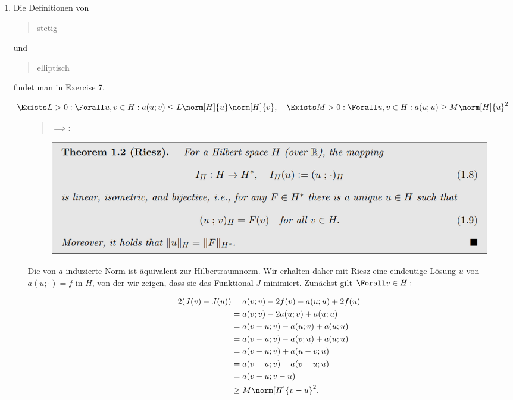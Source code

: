\begin{solution}

\phantom{}

\begin{enumerate}[label = \textbf{\alph*)}]

  \item Die Definitionen von \blockquote{stetig} und \blockquote{elliptisch} findet man in Exercise 7.

  \begin{align*}
    \Exists L > 0:
    \Forall u, v \in H:
    a(u; v) \leq L \norm[H]{u} \norm[H]{v},
    \quad
    \Exists M > 0:
    \Forall u, v \in H:
    a(u; u) \geq M \norm[H]{u}^2
  \end{align*}

  \begin{itemize}

    \item
    [\blockquote{$\implies$:}]

    \begin{figure}[h!]
      \centering
      \includegraphics[width = 0.9 \textwidth]{../../../Fundament-LaTeX/images/NumPDEs/NumPDEs - Theorem 1.2 (Riesz).png}
    \end{figure}

    Die von $a$ induzierte Norm ist äquivalent zur Hilbertraumnorm.
    Wir erhalten daher mit Riesz eine eindeutige Lösung $u$ von $a(u; \cdot) = f$ in $H$, von der wir zeigen, dass sie das Funktional $J$ minimiert.
    Zunächst gilt $\Forall v \in H:$

    \begin{align*}
      2 (J(v) - J(u))
      & =
      a(v; v) - 2f(v) - a(u; u) + 2 f(u) \\
      & =
      a(v; v) -2a(u; v) + a(u; u) \\
      & =
      a(v-u; v) - a(u; v) + a(u; u) \\
      & =
      a(v-u; v) - a(v; u) + a(u; u) \\
      & =
      a(v-u; v) + a(u-v; u) \\
      & =
      a(v-u; v) - a(v-u; u) \\
      & =
      a(v-u; v-u) \\
      & \geq
      M \norm[H]{v-u}^2.
    \end{align*}


\end{itemize}
\end{enumerate}
\end{solution}
